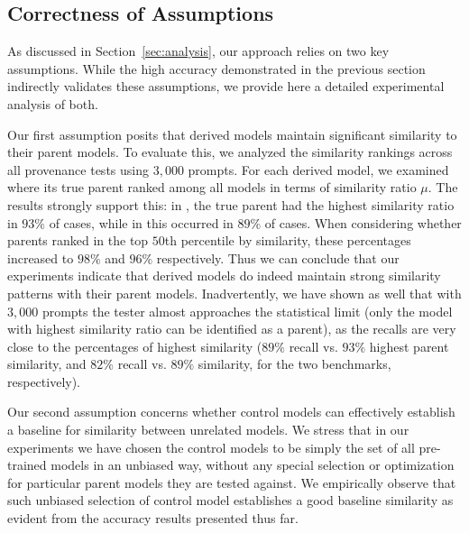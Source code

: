 \subsection{Correctness of Assumptions}
\label{sec:eval:assumptions}

As discussed in Section~\ref{sec:analysis}, our approach relies on two key assumptions. While the high accuracy demonstrated in the previous section indirectly validates these assumptions, we provide here a detailed experimental analysis of both.

Our first assumption posits that derived models maintain significant similarity to their parent models. To evaluate this, we analyzed the similarity rankings across all provenance tests using $3,000$ prompts. For each derived model, we examined where its true parent ranked among all models in terms of similarity ratio $\mu$. The results strongly support this: in \bencho, the true parent had the highest similarity ratio in $93\%$ of cases, while in \bencht this occurred in $89\%$ of cases. When considering whether parents ranked in the top $50$th percentile by similarity, these percentages increased to $98\%$ and $96\%$ respectively. Thus we can conclude that our experiments indicate that derived models do indeed maintain strong similarity patterns with their parent models. Inadvertently, we have shown as well that with $3,000$ prompts the tester almost approaches the statistical limit (only the model with highest similarity ratio can be identified as a parent), as the recalls are very close to the percentages of highest similarity ($89\%$ recall vs. $93\%$ highest parent similarity, and $82\%$ recall vs. $89\%$ similarity, for the two benchmarks, respectively).


%

Our second assumption concerns whether control models can effectively establish a baseline for similarity between unrelated models. We stress that in our experiments we have chosen the control models to be simply the set of all pre-trained models in an unbiased way, without any special selection or optimization for particular parent models they are tested against. 
We empirically observe that such unbiased selection of control model establishes a good baseline similarity as evident from the accuracy results presented thus far.

